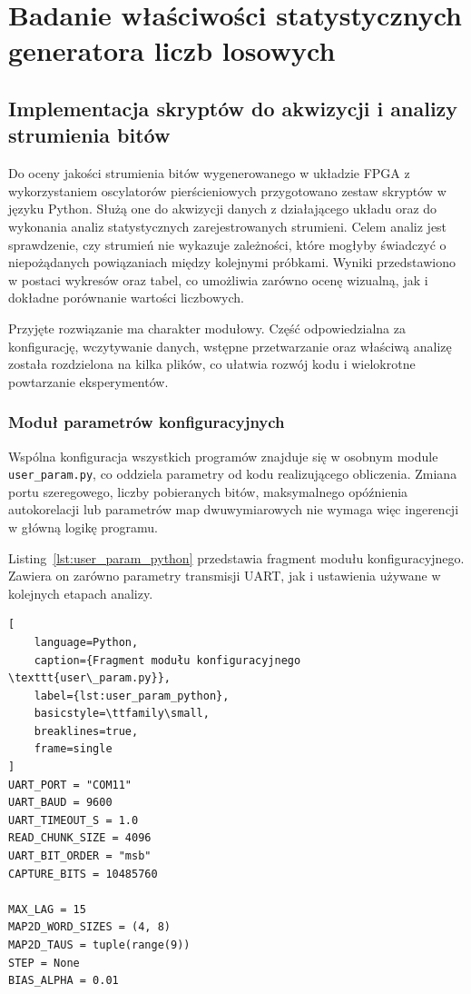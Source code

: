 \chapter{Badanie właściwości statystycznych generatora liczb losowych}

\section{Implementacja skryptów do akwizycji i analizy strumienia bitów}

Do oceny jakości strumienia bitów wygenerowanego w układzie FPGA
z wykorzystaniem oscylatorów pierścieniowych przygotowano zestaw skryptów
w języku Python. Służą one do akwizycji danych z działającego układu oraz do
wykonania analiz statystycznych zarejestrowanych strumieni. Celem analiz jest
sprawdzenie, czy strumień nie wykazuje zależności, które mogłyby świadczyć
o niepożądanych powiązaniach między kolejnymi próbkami. Wyniki przedstawiono
w postaci wykresów oraz tabel, co umożliwia zarówno ocenę wizualną, jak
i dokładne porównanie wartości liczbowych.

Przyjęte rozwiązanie ma charakter modułowy. Część odpowiedzialna za
konfigurację, wczytywanie danych, wstępne przetwarzanie oraz właściwą analizę
została rozdzielona na kilka plików, co ułatwia rozwój kodu i wielokrotne
powtarzanie eksperymentów.

\subsection{Moduł parametrów konfiguracyjnych}

Wspólna konfiguracja wszystkich programów znajduje się w osobnym module
\texttt{user\_param.py}, co oddziela parametry od kodu realizującego obliczenia.
Zmiana portu szeregowego, liczby pobieranych bitów, maksymalnego opóźnienia
autokorelacji lub parametrów map dwuwymiarowych nie wymaga więc ingerencji
w główną logikę programu.

Listing~\ref{lst:user_param_python} przedstawia fragment modułu
konfiguracyjnego. Zawiera on zarówno parametry transmisji UART, jak i ustawienia
używane w kolejnych etapach analizy.

\begin{lstlisting}[
    language=Python,
    caption={Fragment modułu konfiguracyjnego \texttt{user\_param.py}},
    label={lst:user_param_python},
    basicstyle=\ttfamily\small,
    breaklines=true,
    frame=single
]
UART_PORT = "COM11"
UART_BAUD = 9600
UART_TIMEOUT_S = 1.0
READ_CHUNK_SIZE = 4096
UART_BIT_ORDER = "msb"
CAPTURE_BITS = 10485760

MAX_LAG = 15
MAP2D_WORD_SIZES = (4, 8)
MAP2D_TAUS = tuple(range(9))
STEP = None
BIAS_ALPHA = 0.01
\end{lstlisting}

